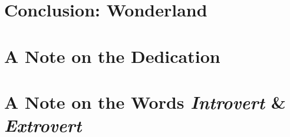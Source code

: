 \documentclass{article}
\numberwithin{equation}{section}
\begin{document}

\section{Conclusion: Wonderland}


\section{A Note on the Dedication}


\section{A Note on the Words \textit{Introvert} \& \textit{Extrovert}}


\printbibliography[heading=bibintoc]
	
\end{document}
